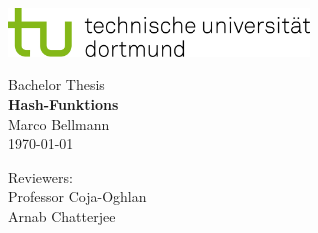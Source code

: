 \begin{titlepage}
    \vspace*{-2cm}
    \newlength{\links}
    \setlength{\links}{-1.5cm}
    \sffamily
    \hspace*{\links}
    \begin{minipage}{12.5cm}
        \includegraphics[width=8cm]{bilder/tud_logo_rgb}
    \end{minipage}

    \vspace*{4cm}

    \hspace*{\links}
    \hspace*{-0.2cm}
    \begin{minipage}{9cm}
        \large
        \begin{center}
            {\Large Bachelor Thesis} \\
            \vspace*{1cm}
            \textbf{Hash-Funktions} \\
            \vspace*{1cm}
            Marco Bellmann\\
            { \today}
        \end{center}
    \end{minipage}
    \normalsize
    \vspace*{5.5cm}


    \vspace*{2.1cm}

    \hspace*{\links}
    \begin{minipage}[b]{5cm}
        \raggedright
        Reviewers: \\
        Professor Coja-Oghlan \\
        Arnab Chatterjee \\
    \end{minipage}


\end{titlepage}
